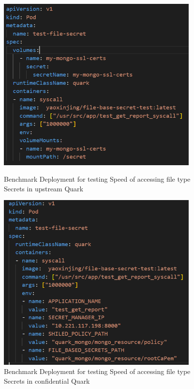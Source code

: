 \begin{figure}
    \centering
    \begin{minipage}{0.45\textwidth}
        \centering
        \includegraphics[width=0.9\textwidth]{images/file_type_secret_access_test_deploy_yaml_baseline.PNG} %
        \caption{Benchmark Deployment for testing Speed of accessing file type Secrets in upstream Quark}
        \label{fig:file_type_secret_access_test_deploy_yaml_baseline}
    \end{minipage}\hfill
    \begin{minipage}{0.45\textwidth}
        \centering
        \includegraphics[width=0.9\textwidth]{images/file_type_secret_access_test_deploy_yaml_cquark.PNG} %
        \caption{Benchmark Deployment for testing Speed of accessing file type Secrets in confidential Quark}
        \label{fig:file_type_secret_access_test_deploy_yaml_cquark}
    \end{minipage}
\end{figure}



